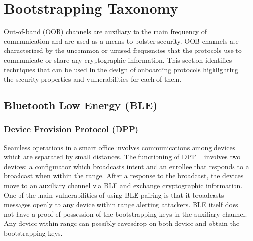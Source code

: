 \section{Bootstrapping Taxonomy}

Out-of-band (OOB) channels are auxiliary to the main frequency of communication and are used as a means to bolster security.
OOB channels are characterized by the uncommon or unused frequencies that the protocols use to communicate or share any cryptographic information.
This section identifies techniques that can be used in the design of onboarding protocols highlighting the security properties and vulnerabilities for each of them. 

\subsection{Bluetooth Low Energy (BLE)}
\subsubsection{Device Provision Protocol (DPP)}
Seamless operations in a smart office involves communications among devices which are separated by small distances.
The functioning of DPP ~\cite{wifialliance} involves two devices: a configurator which broadcasts intent and an enrollee that responds to a broadcast when within the range.
After a response to the broadcast, the devices move to an auxiliary channel via BLE and exchange cryptographic information.
One of the main vulnerabilities of using BLE pairing is that it broadcasts messages openly to any device within range alerting attackers.
BLE itself does not have a proof of possession of the bootstrapping keys in the auxiliary channel.
Any device within range can possibly eavesdrop on both device and obtain the bootstrapping keys.



